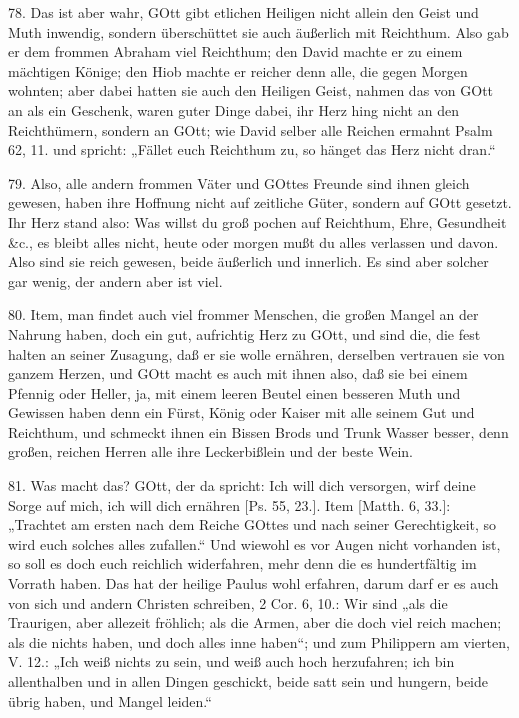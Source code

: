 78. Das ist aber wahr, GOtt gibt etlichen Heiligen nicht allein den Geist und Muth inwendig, sondern überschüttet sie auch äußerlich mit Reichthum. Also gab er dem frommen Abraham viel Reichthum; den David machte er zu einem mächtigen Könige; den Hiob machte er reicher denn alle, die gegen Morgen wohnten; aber dabei hatten sie auch den Heiligen Geist, nahmen das von GOtt an als ein Geschenk, waren guter Dinge dabei, ihr Herz hing nicht an den Reichthümern, sondern an GOtt; wie David selber alle Reichen ermahnt Psalm 62, 11. und spricht: „Fället euch Reichthum zu, so hänget das Herz nicht dran.“

79. Also, alle andern frommen Väter und GOttes Freunde sind ihnen gleich gewesen, haben ihre Hoffnung nicht auf zeitliche Güter, sondern auf GOtt gesetzt. Ihr Herz stand also: Was willst du groß pochen auf Reichthum, Ehre, Gesundheit \&c., es bleibt alles nicht, heute oder morgen mußt du alles verlassen und davon. Also sind sie reich gewesen, beide äußerlich und innerlich. Es sind aber solcher gar wenig, der andern aber ist viel.

80. Item, man findet auch viel frommer Menschen, die großen Mangel an der Nahrung haben, doch ein gut, aufrichtig Herz zu GOtt, und sind die, die fest halten an seiner Zusagung, daß er sie wolle ernähren, derselben vertrauen sie von ganzem Herzen, und GOtt macht es auch mit
ihnen also, daß sie bei einem Pfennig oder Heller, ja, mit einem leeren Beutel einen besseren Muth und Gewissen haben denn ein Fürst, König oder Kaiser mit alle seinem Gut und Reichthum, und schmeckt ihnen ein Bissen Brods und Trunk Wasser besser, denn großen, reichen Herren alle ihre Leckerbißlein und der beste Wein.

81. Was macht das? GOtt, der da spricht: Ich will dich versorgen, wirf deine Sorge auf mich, ich will dich ernähren [Ps. 55, 23.]. Item [Matth. 6, 33.]: „Trachtet am ersten nach dem Reiche GOttes und nach seiner Gerechtigkeit, so wird euch solches alles zufallen.“ Und wiewohl es vor Augen nicht vorhanden ist, so soll es doch euch reichlich widerfahren, mehr denn die es hundertfältig im Vorrath haben. Das hat der heilige Paulus wohl erfahren, darum darf er es auch von sich und andern Christen schreiben, 2 Cor. 6, 10.: Wir sind „als die Traurigen, aber allezeit fröhlich; als die Armen, aber die doch viel reich machen; als die nichts haben, und doch alles inne haben“; und zum Philippern am vierten, V. 12.: „Ich weiß nichts zu sein, und weiß auch hoch herzufahren; ich bin allenthalben und in allen Dingen geschickt, beide satt sein und hungern, beide übrig haben, und Mangel leiden.“

